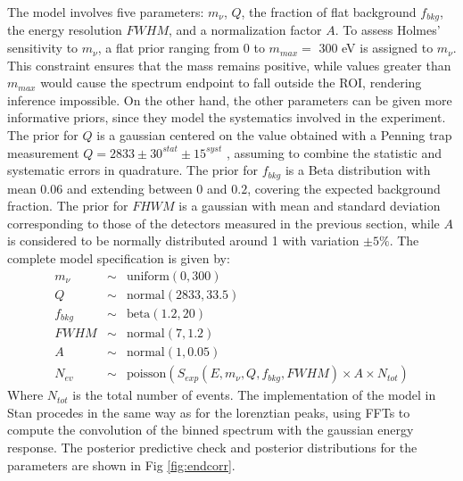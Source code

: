 The model involves five parameters: $m_{\nu}$, $Q$, the fraction of flat background $f_{bkg}$, the energy resolution
$FWHM$, and a normalization factor $A$.
To assess Holmes' sensitivity to $m_{\nu}$, a flat prior ranging from 0 to $m_{max}=$ 300 eV is assigned to $m_{\nu}$.
This constraint ensures that the mass remains positive, while values greater than $m_{max}$ would cause the spectrum
endpoint to fall outside the ROI, rendering inference impossible.
On the other hand, the other parameters can be given more informative priors, since they model the systematics involved
in the experiment. The prior for $Q$ is a gaussian centered on the value obtained with a Penning trap measurement
$Q=2833\pm 30^{stat}\pm 15^{syst}$  \cite{eliseev2015direct}, assuming to
combine the statistic and systematic errors in quadrature. The prior for $f_{bkg}$ is a
Beta distribution with mean $0.06$ and extending between  $0$ and  $0.2$, covering the expected background fraction. The
prior for $FHWM$ is a gaussian with mean and standard deviation corresponding to those of the detectors measured in the
previous section, while $A$ is considered to be normally distributed around 1 with variation  $\pm 5\%$.
The complete model specification is given by:
\begin{eqnarray}
  m_{\nu}&\sim& \text{uniform}(0, 300)\\
  Q &\sim& \text{normal}(2833, 33.5)\\
f_{bkg}&\sim& \text{beta}(1.2,20)\\
FWHM & \sim & \text{normal}(7, 1.2)\\
A &\sim& \text{normal}(1, 0.05)\\
N_{ev} &\sim& \text{poisson}(S_{exp}(E, m_{\nu}, Q, f_{bkg}, FWHM)\times A \times N_{tot})
\end{eqnarray}
Where $N_{tot}$ is the total number of events. The implementation of the model in Stan procedes in the same way as for
the lorenztian peaks, using FFTs to compute the convolution of the binned spectrum with the gaussian energy response.
The posterior predictive check and posterior distributions for the parameters are shown in Fig \ref{fig:endcorr}. 
